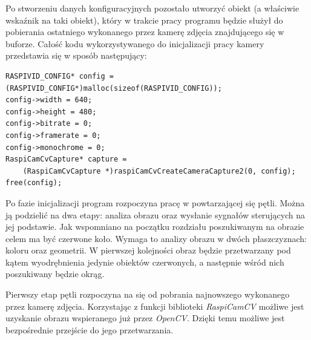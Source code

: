 Po stworzeniu danych konfiguracyjnych pozostało utworzyć obiekt (a właściwie wskaźnik na taki obiekt), który w trakcie pracy programu będzie służył do pobierania ostatniego wykonanego przez kamerę zdjęcia znajdującego się w buforze. Całość kodu wykorzystywanego do inicjalizacji pracy kamery przedstawia się w sposób następujący:
\begin{lstlisting}[caption=Inicjalizacja pracy kamery]
RASPIVID_CONFIG* config = (RASPIVID_CONFIG*)malloc(sizeof(RASPIVID_CONFIG));
config->width = 640;
config->height = 480;
config->bitrate = 0;
config->framerate = 0;
config->monochrome = 0;
RaspiCamCvCapture* capture =
	(RaspiCamCvCapture *)raspiCamCvCreateCameraCapture2(0, config);
free(config); 
\end{lstlisting}

Po fazie inicjalizacji program rozpoczyna pracę w powtarzającej się pętli. Można ją podzielić na dwa etapy: analiza obrazu oraz wysłanie sygnałów sterujących na jej podstawie. Jak wspomniano na początku rozdziału poszukiwanym na obrazie celem ma być czerwone koło. Wymaga to analizy obrazu w dwóch płaszczyznach: koloru oraz geometrii. W pierwszej kolejności obraz będzie przetwarzany pod kątem wyodrębnienia jedynie obiektów czerwonych, a następnie wśród nich poszukiwany będzie okrąg.

Pierwszy etap pętli rozpoczyna na się od pobrania najnowszego wykonanego przez kamerę zdjęcia. Korzystając z funkcji biblioteki \textit{RaspiCamCV} możliwe jest uzyskanie obrazu wspieranego już przez \textit{OpenCV}. Dzięki temu możliwe jest bezpośrednie przejście do jego przetwarzania.

